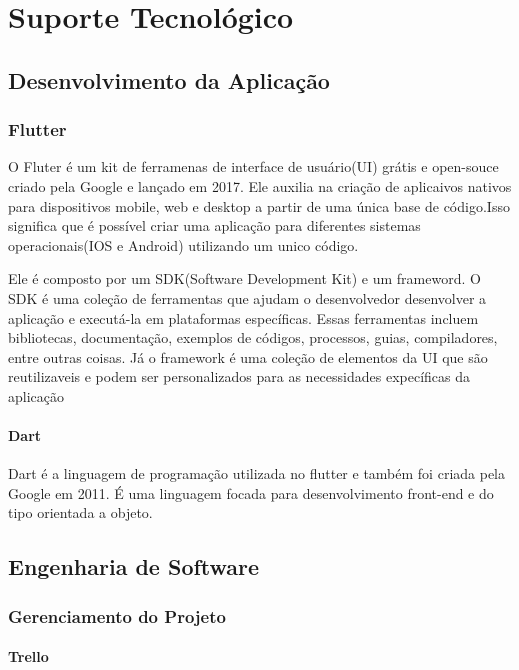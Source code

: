 \chapter[Suporte Tecnológico]{Suporte Tecnológico}

\section{Desenvolvimento da Aplicação}

\subsection{Flutter}

O Fluter é um kit de ferramenas de interface de usuário(UI) grátis e open-souce criado pela Google e lançado em 2017. Ele auxilia na criação de aplicaivos nativos para dispositivos mobile, web e desktop a partir de uma única base de código.Isso significa que é possível criar uma aplicação para diferentes sistemas operacionais(IOS e Android) utilizando um unico código.


Ele é composto por um SDK(Software Development Kit) e um frameword. O SDK é uma coleção de ferramentas que ajudam o desenvolvedor desenvolver a aplicação e executá-la em plataformas específicas. Essas ferramentas incluem bibliotecas, documentação, exemplos de códigos, processos, guias, compiladores, entre outras coisas. Já o framework é uma coleção de elementos da UI que são reutilizaveis e podem ser personalizados para as necessidades expecíficas da aplicação

\subsubsection{Dart}

Dart é a linguagem de programação utilizada no flutter e também foi criada pela Google em 2011. É uma linguagem focada para desenvolvimento front-end e do tipo orientada a objeto.

\section{Engenharia de Software}

\subsection{Gerenciamento do Projeto}

\subsubsection{Trello}

